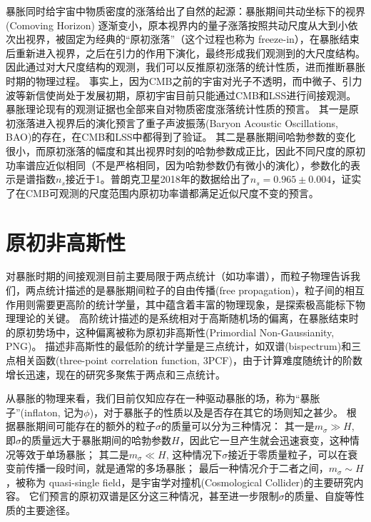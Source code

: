 暴胀同时给宇宙中物质密度的涨落给出了自然的起源：暴胀期间共动坐标下的视界 (Comoving Horizon) 逐渐变小，原本视界内的量子涨落按照共动尺度从大到小依次出视界，被固定为经典的“原初涨落”（这个过程也称为 freeze-in），在暴胀结束后重新进入视界，之后在引力的作用下演化，最终形成我们观测到的大尺度结构。
因此通过对大尺度结构的观测，我们可以反推原初涨落的统计性质，进而推断暴胀时期的物理过程。
事实上，因为CMB之前的宇宙对光子不透明，而中微子、引力波等新信使尚处于发展初期，原初宇宙目前只能通过CMB和LSS进行间接观测。
暴胀理论现有的观测证据也全部来自对物质密度涨落统计性质的预言。%
其一是原初涨落进入视界后的演化预言了重子声波振荡(Baryon Acoustic Oscillations, BAO)的存在，在CMB和LSS中都得到了验证。
其二是暴胀期间哈勃参数的变化很小，而原初涨落的幅度和其出视界时刻的哈勃参数成正比，因此不同尺度的原初功率谱应近似相同（不是严格相同，因为哈勃参数仍有微小的演化），参数化的表示是谱指数$n_s$接近于1。普朗克卫星2018年的数据给出了$n_s=0.965\pm0.004$\cite{planck18}，证实了在CMB可观测的尺度范围内原初功率谱都满足近似尺度不变的预言。

\section{原初非高斯性} %

对暴胀时期的间接观测目前主要局限于两点统计（如功率谱），而粒子物理告诉我们，两点统计描述的是暴胀期间粒子的自由传播(free propagation)，粒子间的相互作用则需要更高阶的统计学量，其中蕴含着丰富的物理现象，是探索极高能标下物理理论的关键\cite{meerburg2019PNG}。
高阶统计描述的是系统相对于高斯随机场的偏离，在暴胀结束时的原初势场中，这种偏离被称为原初非高斯性(Primordial Non-Gaussianity, PNG)。
描述非高斯性的最低阶的统计学量是三点统计，如双谱(bispectrum)和三点相关函数(three-point correlation function, 3PCF)，由于计算难度随统计的阶数增长迅速，现在的研究多聚焦于两点和三点统计。

从暴胀的物理来看，我们目前仅知应存在一种驱动暴胀的场，称为“暴胀子”(inflaton, 记为$\phi$)，对于暴胀子的性质以及是否存在其它的场则知之甚少。
根据暴胀期间可能存在的额外的粒子$\sigma$的质量可以分为三种情况：
其一是$m_\sigma \gg H$, 即$\sigma$的质量远大于暴胀期间的哈勃参数$H$，因此它一旦产生就会迅速衰变，这种情况等效于单场暴胀；
其二是$m_\sigma \ll H$, 这种情况下$\sigma$接近于零质量粒子，可以在衰变前传播一段时间，就是通常的多场暴胀；
最后一种情况介于二者之间，$m_\sigma \sim H$，被称为 quasi-single field，是宇宙学对撞机(Cosmological Collider)的主要研究内容\cite{arkani-hamed2015coco}。
它们预言的原初双谱是区分这三种情况，甚至进一步限制$\sigma$的质量、自旋等性质的主要途径。

